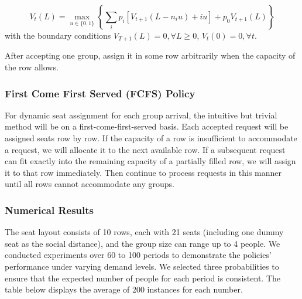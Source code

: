 $$V_{t}(L) =  \max_{u \in \{0,1\}} \left\{ \sum_{i} p_i [V_{t+1}(L-n_i u)+ i u] + p_0 V_{t+1}(L)\right\} $$
with the boundary conditions $V_{T+1}(L) =0, \forall L \geq 0$, $V_{t}(0) =0, \forall t$.

After accepting one group, assign it in some row arbitrarily when the capacity of the row allows.

\subsubsection*{First Come First Served (FCFS) Policy}

For dynamic seat assignment for each group arrival, the intuitive but trivial method will be on a first-come-first-served basis. Each accepted request will be assigned seats row by row. If the capacity of a row is insufficient to accommodate a request, we will allocate it to the next available row. If a subsequent request can fit exactly into the remaining capacity of a partially filled row, we will assign it to that row immediately. Then continue to process requests in this manner until all rows cannot accommodate any groups.

\subsubsection*{Numerical Results}
The seat layout consists of 10 rows, each with 21 seats (including one dummy seat as the social distance), and the group size can range up to 4 people. We conducted experiments over 60 to 100 periods to demonstrate the policies' performance under varying demand levels. We selected three probabilities to ensure that the expected number of people for each period is consistent. The table below displays the average of 200 instances for each number.

